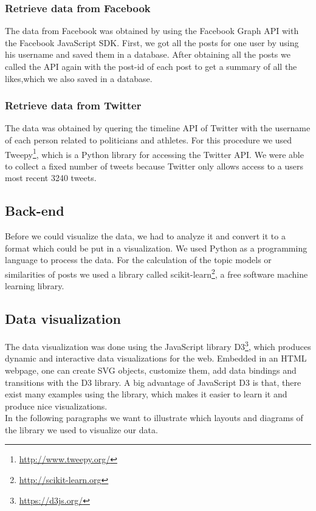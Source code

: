\subsubsection{Retrieve data from Facebook}
The data from Facebook was obtained by using the Facebook Graph API with the Facebook JavaScript SDK. First, we got all the posts for one user by using his username and saved them in a database. After obtaining all the posts we called the API again with the post-id of each post to get a summary of all the likes,which we also saved in a database.

\subsubsection{Retrieve data from Twitter}

The data was obtained by quering the timeline API of Twitter with the username of each person related to politicians and athletes. For this procedure we used  Tweepy\footnote{\url{http://www.tweepy.org/}}, which is a Python library for accessing the Twitter API. We were able to collect a fixed number of tweets because Twitter only allows access to a users most recent 3240 tweets.  

\subsection{Back-end}
Before we could visualize the data, we had to analyze it and convert it to a format which could be put in a visualization. We used Python as a programming language to process the data. For the calculation of the topic models or similarities of posts we used a library called scikit-learn\footnote{\url{http://scikit-learn.org}}, a free software machine learning library.   

\subsection{Data visualization}
The data visualization was done using the JavaScript library D3\footnote{\url{https://d3js.org/}}, which produces dynamic and interactive data visualizations for the web. Embedded in an HTML webpage, one can create SVG objects, customize them, add data bindings and transitions  with the D3 library. A big advantage of JavaScript D3 is that, there exist many examples using the library, which makes it easier to learn it and produce nice visualizations. \\
In the following paragraphs we want to illustrate which layouts and diagrams of the library we used to visualize our data. 


